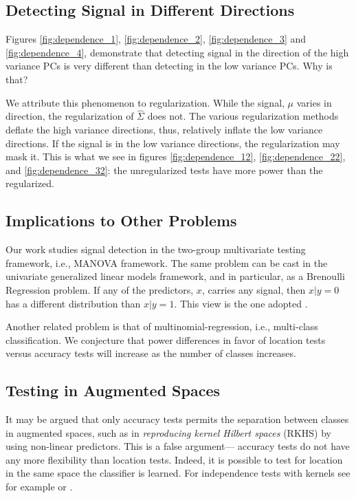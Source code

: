 \documentclass[12pt,a4paper]{article}
\begin{document}
\subsection{Detecting Signal in Different Directions}
Figures \ref{fig:dependence_1}, \ref{fig:dependence_2}, \ref{fig:dependence_3} and \ref{fig:dependence_4}, demonstrate that detecting signal in the direction of the high variance PCs is very different than detecting in the low variance PCs.
Why is that?

We attribute this phenomenon to regularization.
While the signal, $\mu$ varies in direction, the regularization of $\hat \Sigma$ does not. 
The various regularization methods deflate the high variance directions, thus, relatively inflate the low variance directions.
If the signal is in the low variance directions, the regularization may mask it. 
This is what we see in figures \ref{fig:dependence_12}, \ref{fig:dependence_22}, and \ref{fig:dependence_32}: the unregularized tests have more power than the regularized. 



\subsection{Implications to Other Problems}

Our work studies signal detection in the two-group multivariate testing framework, i.e., MANOVA framework.
The same problem can be cast in the univariate generalized linear models framework, and in particular, as a Brenoulli Regression problem.
If any of the predictors, $x$, carries any signal, then $x|y=0$ has a different distribution than $x|y=1$.
This view is the one adopted \cite{goeman2006testing}.

Another related problem is that of multinomial-regression, i.e., multi-class classification.
We conjecture that power differences in favor of location tests versus accuracy tests will increase as the number of classes increases.




\subsection{Testing in Augmented Spaces}
It may be argued that only accuracy tests permits the separation between classes in augmented spaces, such as in \emph{reproducing kernel Hilbert spaces} (RKHS) by using non-linear predictors. 
This is a false argument--- accuracy tests do not have any more flexibility than location tests. 
Indeed, it is possible to test for location in the same space the classifier is learned. 
For independence tests  with kernels see for example \cite{szekely_brownian_2009} or \citet{gretton_kernel_2012-1}.
\end{document}
